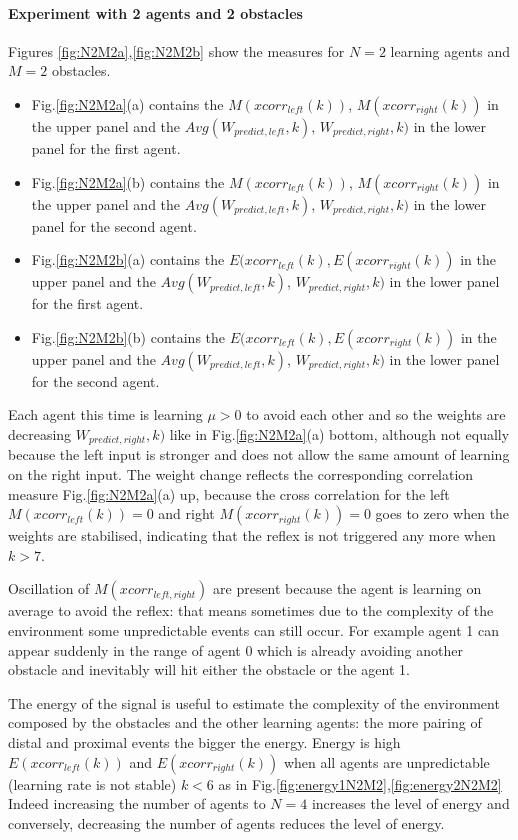 \paragraph{Experiment with 2 agents and 2 obstacles}
Figures \ref{fig:N2M2a},\ref{fig:N2M2b} show the measures for $N=2$ learning agents and $M=2$ obstacles.
\begin{itemize}
 \item Fig.\ref{fig:N2M2a}(a) contains the $M(xcorr_{left}(k))$, $M(xcorr_{right}(k))$ in the upper panel
and the $Avg(W_{predict,left},k)$, $W_{predict,right},k)$ in the lower panel for the first agent.
 \item Fig.\ref{fig:N2M2a}(b) contains the $M(xcorr_{left}(k))$, $M(xcorr_{right}(k))$ in the upper panel
and the $Avg(W_{predict,left},k)$, $W_{predict,right},k)$ in the lower panel for the second agent.
\item Fig.\ref{fig:N2M2b}(a) contains the $E(xcorr_{left}(k),E(xcorr_{right}(k))$ in the upper panel
and the $Avg(W_{predict,left},k)$, $W_{predict,right},k)$ in the lower panel for the first agent.
\item Fig.\ref{fig:N2M2b}(b) contains the $E(xcorr_{left}(k),E(xcorr_{right}(k))$ in the upper panel
and the $Avg(W_{predict,left},k)$, $W_{predict,right},k)$ in the lower panel for the second agent.
\end{itemize}

Each agent this time is learning $\mu>0$ to avoid each other and so the weights are
decreasing $W_{predict,right},k)$ like in Fig.\ref{fig:N2M2a}(a) bottom, although not equally
because the left input is stronger and does not allow the same amount of learning
on the right input.
The weight change reflects the  corresponding correlation measure Fig.\ref{fig:N2M2a}(a) up,
because the cross correlation for the left $M(xcorr_{left}(k))=0$ and right $M(xcorr_{right}(k))=0$
goes to zero when the weights are stabilised, indicating that the reflex is not triggered
any more when $k>7$.

Oscillation of $M(xcorr_{left,right})$ are present because the agent is learning on average to avoid
the reflex: that means sometimes due to the complexity of the environment some
unpredictable events can still occur.
For example agent 1 can appear suddenly in the range of agent 0 which is already
avoiding another obstacle and inevitably will hit either the obstacle or the agent 1.

The energy of the signal is useful to estimate the complexity of the environment
composed by the obstacles and the other learning agents:
the more pairing of distal and proximal events the bigger the energy.
Energy is high $E(xcorr_{left}(k))$ and $E(xcorr_{right}(k))$ when all agents are unpredictable
(learning rate is not stable) $k<6$ as in Fig.\ref{fig:energy1N2M2},\ref{fig:energy2N2M2}
Indeed increasing the number of agents to $N=4$ increases the level of energy and conversely, 
decreasing the number of agents reduces the level of energy.

